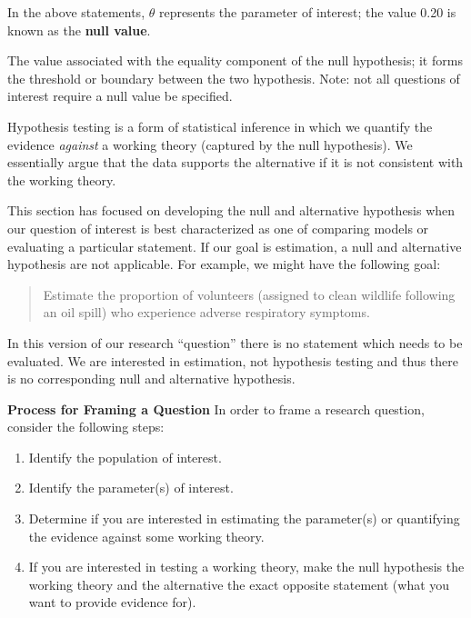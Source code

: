 \documentclass[]{book}
\providecommand{\tightlist}{%
  \setlength{\itemsep}{0pt}\setlength{\parskip}{0pt}}
\theoremstyle{plain}
\theoremstyle{mydefn}
\theoremstyle{myexmpl}
\theoremstyle{remark}
\let\BeginKnitrBlock\begin \let\EndKnitrBlock\end
\let\BeginKnitrBlock\begin \let\EndKnitrBlock\end
\begin{document}
In the above statements, \(\theta\) represents the parameter of
interest; the value 0.20 is known as the \textbf{null value}.

\BeginKnitrBlock{definition}[Null Value]
\protect\hypertarget{def:defn-null-value}{}{\label{def:defn-null-value}
{} }The value associated with the equality
component of the null hypothesis; it forms the threshold or boundary
between the two hypothesis. Note: not all questions of interest require
a null value be specified.
\EndKnitrBlock{definition}

\BeginKnitrBlock{rmdkeyidea}
Hypothesis testing is a form of statistical inference in which we
quantify the evidence \emph{against} a working theory (captured by the
null hypothesis). We essentially argue that the data supports the
alternative if it is not consistent with the working theory.
\EndKnitrBlock{rmdkeyidea}

This section has focused on developing the null and alternative
hypothesis when our question of interest is best characterized as one of
comparing models or evaluating a particular statement. If our goal is
estimation, a null and alternative hypothesis are not applicable. For
example, we might have the following goal:

\begin{quote}
Estimate the proportion of volunteers (assigned to clean wildlife
following an oil spill) who experience adverse respiratory symptoms.
\end{quote}

In this version of our research ``question'' there is no statement which
needs to be evaluated. We are interested in estimation, not hypothesis
testing and thus there is no corresponding null and alternative
hypothesis.

\BeginKnitrBlock{rmdtip}
\textbf{Process for Framing a Question} In order to frame a research
question, consider the following steps:

\begin{enumerate}
\def\labelenumi{\arabic{enumi}.}
\tightlist
\item
  Identify the population of interest.
\item
  Identify the parameter(s) of interest.
\item
  Determine if you are interested in estimating the parameter(s) or
  quantifying the evidence against some working theory.
\item
  If you are interested in testing a working theory, make the null
  hypothesis the working theory and the alternative the exact opposite
  statement (what you want to provide evidence for).
\end{enumerate}
\EndKnitrBlock{rmdtip}
\end{document}
